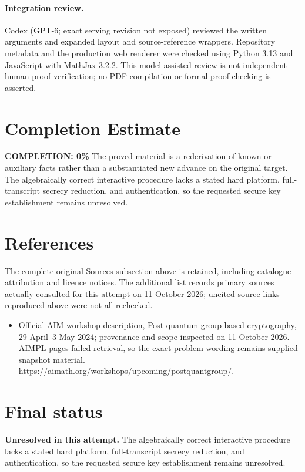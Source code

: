 \documentclass[11pt]{article}
\begin{document}
\paragraph{Integration review.} Codex (GPT-6; exact serving revision not exposed) reviewed the written arguments and expanded layout and source-reference wrappers. Repository metadata and the production web renderer were checked using Python 3.13 and JavaScript with MathJax 3.2.2. This model-assisted review is not independent human proof verification; no PDF compilation or formal proof checking is asserted.

\section{Completion Estimate}
\noindent\textbf{COMPLETION: 0\%}
The proved material is a rederivation of known or auxiliary facts rather than a substantiated new advance on the original target. The algebraically correct interactive procedure lacks a stated hard platform, full-transcript secrecy reduction, and authentication, so the requested secure key establishment remains unresolved.
\section{References}
The complete original Sources subsection above is retained, including catalogue attribution and licence notices. The additional list records primary sources actually consulted for this attempt on 11 October 2026; uncited source links reproduced above were not all rechecked.
\begin{itemize}
\item Official AIM workshop description, Post-quantum group-based cryptography, 29 April--3 May 2024; provenance and scope inspected on 11 October 2026. AIMPL pages failed retrieval, so the exact problem wording remains supplied-snapshot material. \url{https://aimath.org/workshops/upcoming/postquantgroup/}.
\end{itemize}
\section{Final status}
\textbf{Unresolved in this attempt.} The algebraically correct interactive procedure lacks a stated hard platform, full-transcript secrecy reduction, and authentication, so the requested secure key establishment remains unresolved.
\end{document}
